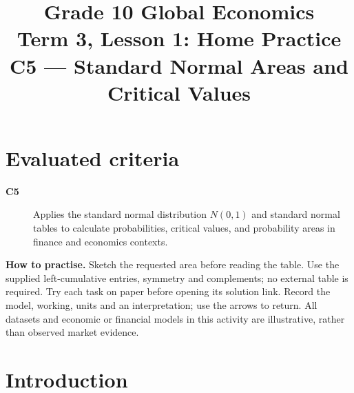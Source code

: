 \makeatletter
{}
\makeatother




\title{Grade 10 Global Economics\\Term 3, Lesson 1: Home Practice\\C5 --- Standard Normal Areas and Critical Values}
\author{}
\date{}

\maketitle
\setcounter{tocdepth}{1}
\setcounter{secnumdepth}{2}
\label{toc}
\tableofcontents
\section*{Evaluated criteria}
\begin{description}
\item[\textbf{C5}] Applies the standard normal distribution \(N(0,1)\) and standard normal tables to calculate probabilities, critical values, and probability areas in finance and economics contexts.
\end{description}
\textbf{How to practise.} Sketch the requested area before reading the table. Use the supplied left-cumulative entries, symmetry and complements; no external table is required. Try each task on paper before opening its solution link. Record the model, working, units and an interpretation; use the arrows to return.
All datasets and economic or financial models in this activity are illustrative, rather than observed market evidence.

\clearpage
\section{Introduction}\label{sec:introduction}

